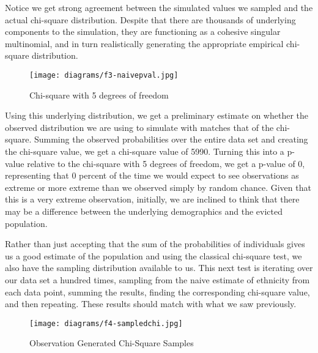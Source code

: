 \par Notice we get strong agreement between the simulated values we sampled and the actual chi-square distribution.  Despite that there are thousands of underlying components to the simulation, they are functioning as a cohesive singular multinomial, and in turn realistically generating the appropriate empirical chi-square distribution.

\begin{wrapfigure}{r}{2in}
\texttt{[image: diagrams/f3-naivepval.jpg]}
\caption{Chi-square with 5 degrees of freedom}
\label{fig:figure3}
\end{wrapfigure}

\par Using this underlying distribution, we get a preliminary estimate on whether the observed distribution we are using to simulate with matches that of the chi-square.  Summing the observed probabilities over the entire data set and creating the chi-square value, we get a chi-square value of 5990.  Turning this into a p-value relative to the chi-square with 5 degrees of freedom, we get a p-value of 0, representing that 0 percent of the time we would expect to see observations as extreme or more extreme than we observed simply by random chance.  Given that this is a very extreme observation, initially, we are inclined to think that there may be a difference between the underlying demographics and the evicted population.


\par Rather than just accepting that the sum of the probabilities of individuals gives us a good estimate of the population and using the classical chi-square test, we also have the sampling distribution available to us.  This next test is iterating over our data set a hundred times, sampling from the naive estimate of ethnicity from each data point, summing the results, finding the corresponding chi-square value, and then repeating.  These results should match with what we saw previously.

\begin{wrapfigure}{r}{2in}
\texttt{[image: diagrams/f4-sampledchi.jpg]}
\caption{Observation Generated Chi-Square Samples}
\label{fig:figure4}
\end{wrapfigure}

